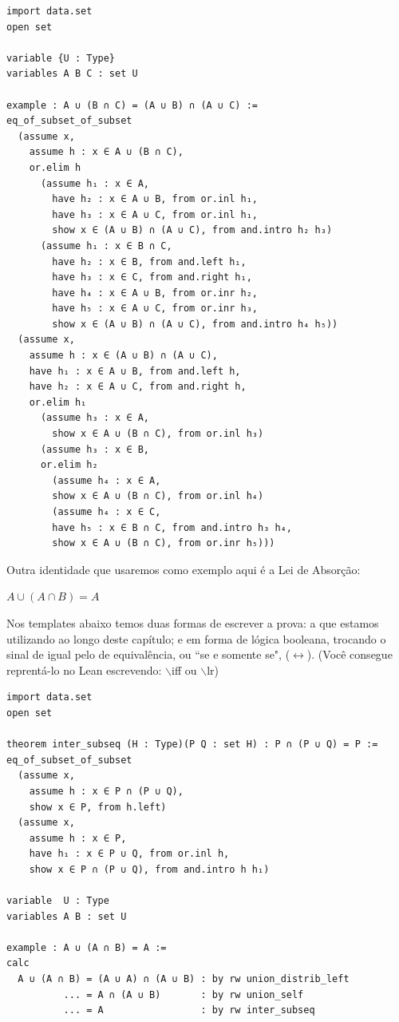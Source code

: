 \begin{lstlisting}
import data.set
open set

variable {U : Type}
variables A B C : set U

example : A ∪ (B ∩ C) = (A ∪ B) ∩ (A ∪ C) :=
eq_of_subset_of_subset
  (assume x,
    assume h : x ∈ A ∪ (B ∩ C),
    or.elim h
      (assume h₁ : x ∈ A,
        have h₂ : x ∈ A ∪ B, from or.inl h₁,
        have h₃ : x ∈ A ∪ C, from or.inl h₁,
        show x ∈ (A ∪ B) ∩ (A ∪ C), from and.intro h₂ h₃)
      (assume h₁ : x ∈ B ∩ C,
        have h₂ : x ∈ B, from and.left h₁,
        have h₃ : x ∈ C, from and.right h₁,
        have h₄ : x ∈ A ∪ B, from or.inr h₂,
        have h₅ : x ∈ A ∪ C, from or.inr h₃,
        show x ∈ (A ∪ B) ∩ (A ∪ C), from and.intro h₄ h₅))
  (assume x,
    assume h : x ∈ (A ∪ B) ∩ (A ∪ C),
    have h₁ : x ∈ A ∪ B, from and.left h,
    have h₂ : x ∈ A ∪ C, from and.right h,
    or.elim h₁
      (assume h₃ : x ∈ A,
        show x ∈ A ∪ (B ∩ C), from or.inl h₃)
      (assume h₃ : x ∈ B,
      or.elim h₂
        (assume h₄ : x ∈ A,
        show x ∈ A ∪ (B ∩ C), from or.inl h₄)
        (assume h₄ : x ∈ C,
        have h₅ : x ∈ B ∩ C, from and.intro h₃ h₄, 
        show x ∈ A ∪ (B ∩ C), from or.inr h₅)))
\end{lstlisting}

Outra identidade que usaremos como exemplo aqui é a Lei de Absorção:  

\begin{center}
    $A \cup (A \cap B) = A$
\end{center}

Nos templates abaixo temos duas formas de escrever a prova: a que estamos utilizando ao longo deste capítulo; e em forma de lógica booleana, trocando o sinal de igual pelo de equivalência, ou ``se e somente se", ($\leftrightarrow$). (Você consegue reprentá-lo no Lean escrevendo: $\backslash$iff ou $\backslash$lr)

\begin{lstlisting}
import data.set
open set

theorem inter_subseq (H : Type)(P Q : set H) : P ∩ (P ∪ Q) = P :=
eq_of_subset_of_subset
  (assume x,
    assume h : x ∈ P ∩ (P ∪ Q),
    show x ∈ P, from h.left)
  (assume x,
    assume h : x ∈ P,
    have h₁ : x ∈ P ∪ Q, from or.inl h,
    show x ∈ P ∩ (P ∪ Q), from and.intro h h₁)

variable  U : Type
variables A B : set U

example : A ∪ (A ∩ B) = A :=
calc
  A ∪ (A ∩ B) = (A ∪ A) ∩ (A ∪ B) : by rw union_distrib_left
          ... = A ∩ (A ∪ B)       : by rw union_self
          ... = A                 : by rw inter_subseq
\end{lstlisting}

